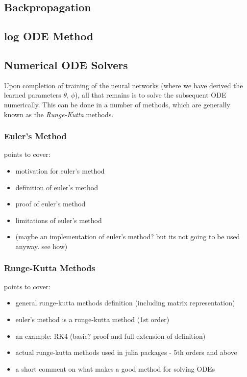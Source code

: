 \documentclass[a4paper,11pt, titlepage]{article}
\theoremstyle{definition}
\theoremstyle{plain}
\theoremstyle{remark}
\begin{document}
\subsection{Backpropagation}

\subsection{log ODE Method}

\subsection{Numerical ODE Solvers}
Upon completion of training of the neural networks (where we have derived the learned parameters $\theta$, $\phi$), all that remains is to solve the subsequent ODE numerically. This can be done in a number of methods, which are generally known as the \textit{Runge-Kutta} methods.

\subsubsection{Euler's Method}
points to cover:
\begin{itemize}
    \item motivation for euler's method
    \item definition of euler's method
    \item proof of euler's method
    \item limitations of euler's method
    \item (maybe an implementation of euler's method? but its not going to be used anyway. see how)
\end{itemize}

\subsubsection{Runge-Kutta Methods}
points to cover:
\begin{itemize}
    \item general runge-kutta methods definition (including matrix representation)
    \item euler's method is a runge-kutta method (1st order)
    \item an example: RK4 (basic? proof and full extension of definition)
    \item actual runge-kutta methods used in julia packages - 5th orders and above  
    \item a short comment on what makes a good method for solving ODEs
\end{itemize}
\end{document}
